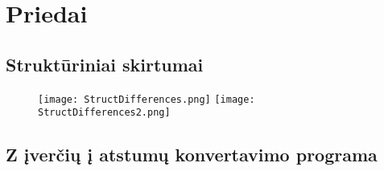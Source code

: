 \documentclass[a4paper,12pt]{article}
\begin{document}
\clearpage


\section{Priedai}

\subsection{Struktūriniai skirtumai}

\vspace*{1cm}
\begin{figure}[!tph]
	\hspace*{-0.8cm}
	\texttt{[image: StructDifferences.png]}
	\texttt{[image: StructDifferences2.png]}
\end{figure}

\clearpage


\subsection{Z įverčių į atstumų konvertavimo programa}

\begin{figure}[htbp]
	\hspace{-8cm}
	\centering
	\hspace*{-8cm}
	
\end{figure}	

\vspace{-2cm}
\begin{figure}[htbp]
	\hspace{-8cm}
	\vspace*{-1cm}
	\centering
	\hspace*{-8cm}
	
\end{figure}	

\begin{figure}[htbp]
	\hspace{-8cm}
	\centering
	\hspace*{-8cm}
	
\end{figure}
	
\begin{figure}[htbp]
	\hspace{-8cm}
	\centering
	\hspace*{-8cm}
	
\end{figure}	
\clearpage
\end{document}
